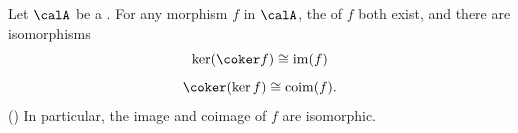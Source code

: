 \begin{lemma} \label{lemma:image_coimage_of_a_morphism_in_an_abelian_category_coincides_with_kernel_of_cokernel_cokernel_of_kernel}
    Let $\calA$ be a . 
    For any morphism $f$ in $\calA$, the  of $f$ both exist, and there are isomorphisms
    $$\ker(\coker f) \cong \operatorname{im}(f)$$ 
    $$\coker(\ker f) \cong \operatorname{coim}(f).$$ 
    () In particular, the image and coimage of $f$ are isomorphic.
\end{lemma}